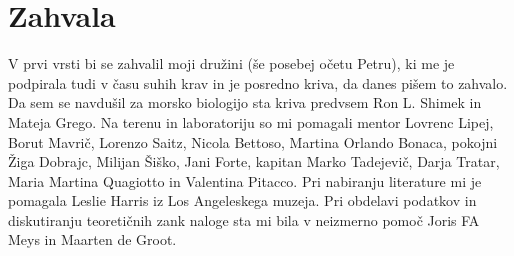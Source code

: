 \newpage
\section*{Zahvala}


V prvi vrsti bi se zahvalil moji družini (še posebej očetu Petru), ki me je podpirala tudi v času suhih krav in je posredno kriva, da danes pišem to zahvalo. Da sem se navdušil za morsko biologijo sta kriva predvsem Ron L. Shimek in Mateja Grego. Na terenu in laboratoriju so mi pomagali mentor Lovrenc Lipej, Borut Mavrič, Lorenzo Saitz, Nicola Bettoso, Martina Orlando Bonaca, pokojni Žiga Dobrajc, Milijan Šiško, Jani Forte, kapitan Marko Tadejevič, Darja Tratar, Maria Martina Quagiotto in Valentina Pitacco. Pri nabiranju literature mi je pomagala Leslie Harris iz Los Angeleskega muzeja. Pri obdelavi podatkov in diskutiranju teoretičnih zank naloge sta mi bila v neizmerno pomoč Joris FA Meys in Maarten de Groot.
